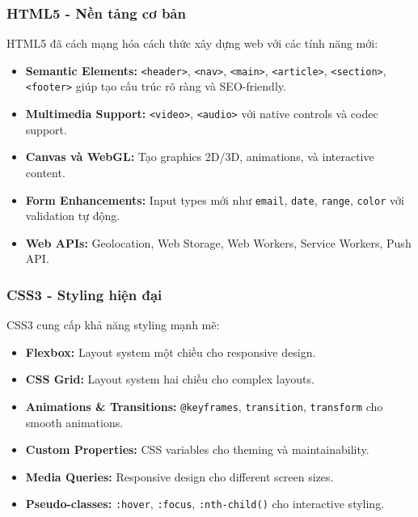 \documentclass[a4paper,12pt]{report}
\begin{document}
\subsubsection{HTML5 - Nền tảng cơ bản}
HTML5 đã cách mạng hóa cách thức xây dựng web với các tính năng mới:
\begin{itemize}
    \item \textbf{Semantic Elements:} \texttt{<header>}, \texttt{<nav>}, \texttt{<main>}, \texttt{<article>}, \texttt{<section>}, \texttt{<footer>} giúp tạo cấu trúc rõ ràng và SEO-friendly.
    \item \textbf{Multimedia Support:} \texttt{<video>}, \texttt{<audio>} với native controls và codec support.
    \item \textbf{Canvas và WebGL:} Tạo graphics 2D/3D, animations, và interactive content.
    \item \textbf{Form Enhancements:} Input types mới như \texttt{email}, \texttt{date}, \texttt{range}, \texttt{color} với validation tự động.
    \item \textbf{Web APIs:} Geolocation, Web Storage, Web Workers, Service Workers, Push API.
\end{itemize}

\subsubsection{CSS3 - Styling hiện đại}
CSS3 cung cấp khả năng styling mạnh mẽ:
\begin{itemize}
    \item \textbf{Flexbox:} Layout system một chiều cho responsive design.
    \item \textbf{CSS Grid:} Layout system hai chiều cho complex layouts.
    \item \textbf{Animations \& Transitions:} \texttt{@keyframes}, \texttt{transition}, \texttt{transform} cho smooth animations.
    \item \textbf{Custom Properties:} CSS variables cho theming và maintainability.
    \item \textbf{Media Queries:} Responsive design cho different screen sizes.
    \item \textbf{Pseudo-classes:} \texttt{:hover}, \texttt{:focus}, \texttt{:nth-child()} cho interactive styling.
\end{itemize}
\end{document}
